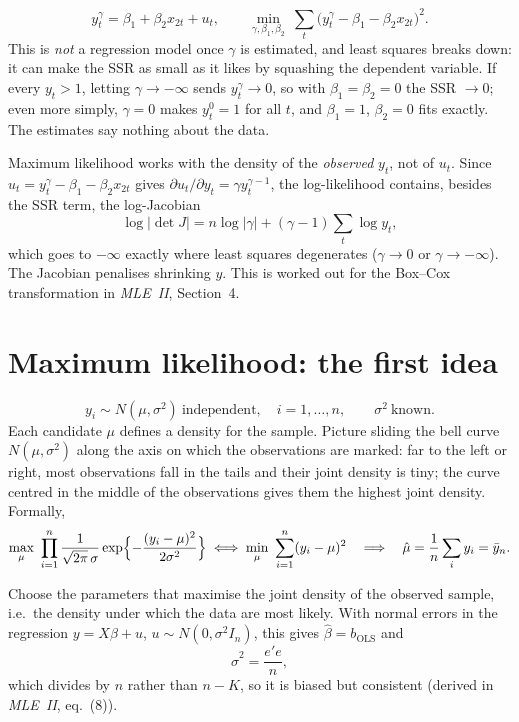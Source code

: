 \documentclass[11pt]{article}
\begin{document}
\[ y_{t}^{\gamma}=\beta_{1}+\beta_{2}x_{2t}+u_{t}, \qquad
   \min_{\gamma,\beta_{1},\beta_{2}}\ \sum_{t}\bigl(y_{t}^{\gamma}-\beta_{1}-\beta_{2}x_{2t}\bigr)^{2}. \]
This is \emph{not} a regression model once $\gamma$ is estimated, and least squares breaks down:
it can make the SSR as small as it likes by squashing the dependent variable. If every
$y_{t}>1$, letting $\gamma\to-\infty$ sends $y_{t}^{\gamma}\to0$, so with $\beta_{1}=\beta_{2}=0$ the
SSR $\to0$; even more simply, $\gamma=0$ makes $y_{t}^{0}=1$ for all $t$, and $\beta_{1}=1$,
$\beta_{2}=0$ fits exactly. The estimates say nothing about the data.

Maximum likelihood works with the density of the \emph{observed} $y_{t}$, not of $u_{t}$. Since
$u_{t}=y_{t}^{\gamma}-\beta_{1}-\beta_{2}x_{2t}$ gives $\partial u_{t}/\partial y_{t}=\gamma y_{t}^{\gamma-1}$, the
log-likelihood contains, besides the SSR term, the log-Jacobian
\[ \log\lvert\det J\rvert=n\log\lvert\gamma\rvert+(\gamma-1)\sum_{t}\log y_{t}, \]
which goes to $-\infty$ exactly where least squares degenerates ($\gamma\to0$ or
$\gamma\to-\infty$). The Jacobian penalises shrinking $y$. This is worked out for the
Box--Cox transformation in \emph{MLE~II}, Section~4.

\section{Maximum likelihood: the first idea}

\[ y_{i}\sim N(\mu,\sigma^{2})\ \text{independent}, \quad i=1,\ldots,n, \qquad \sigma^{2}\ \text{known}. \]
Each candidate $\mu$ defines a density for the sample. Picture sliding the bell curve
$N(\mu,\sigma^{2})$ along the axis on which the observations are marked: far to the left or
right, most observations fall in the tails and their joint density is tiny; the curve
centred in the middle of the observations gives them the highest joint density. Formally,
\[ \max_{\mu}\ \prod_{i=1}^{n}\frac{1}{\sqrt{2\pi}\,\sigma}
     \exp\Bigl\{-\frac{(y_{i}-\mu)^{2}}{2\sigma^{2}}\Bigr\}
   \iff \min_{\mu}\ \sum_{i=1}^{n}(y_{i}-\mu)^{2}
   \quad\Longrightarrow\quad \hat\mu=\frac{1}{n}\sum_{i}y_{i}=\bar y_{n}. \]

Choose the parameters that maximise the joint density of the observed sample, i.e.\
the density under which the data are most likely. With normal errors in the regression
$y=X\beta+u$, $u\sim N(0,\sigma^{2}I_{n})$, this gives $\hat\beta=b_{\text{OLS}}$ and
\[ \hat\sigma^{2}=\frac{e'e}{n}, \]
which divides by $n$ rather than $n-K$, so it is biased but consistent (derived in
\emph{MLE~II}, eq.~(8)).
\end{document}
